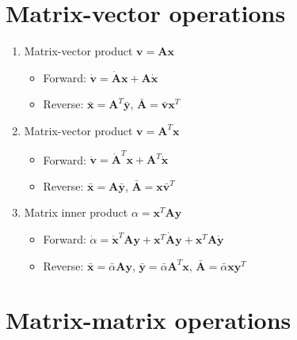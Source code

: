 \documentclass{article}
\begin{document}
\section{Matrix-vector operations}

\begin{enumerate}
\item Matrix-vector product $\mathbf{v} = \mathbf{A} \mathbf{x}$
\begin{itemize}
\item Forward: $\dot{\mathbf{v}} = \dot{\mathbf{A}} \mathbf{x} + \mathbf{A} \dot{\mathbf{x}}$
\item Reverse: $\bar{\mathbf{x}} = \mathbf{A}^{T} \bar{\mathbf{y}}$, $\bar{\mathbf{A}} = \bar{\mathbf{v}} \mathbf{x}^{T}$
\end{itemize}

\item Matrix-vector product $\mathbf{v} = \mathbf{A}^{T} \mathbf{x}$
\begin{itemize}
\item Forward: $\dot{\mathbf{v}} = \dot{\mathbf{A}}^{T} \mathbf{x} + \mathbf{A}^{T} \dot{\mathbf{x}}$
\item Reverse: $\bar{\mathbf{x}} = \mathbf{A} \bar{\mathbf{y}}$, $\bar{\mathbf{A}} = \mathbf{x} \bar{\mathbf{v}}^{T}$
\end{itemize}

\item Matrix inner product $\alpha = \mathbf{x}^{T} \mathbf{A} \mathbf{y}$
\begin{itemize}
\item Forward: $\dot{\alpha} = \dot{\mathbf{x}}^{T} \mathbf{A} \mathbf{y} + \mathbf{x}^{T} \dot{\mathbf{A}} \mathbf{y} + \mathbf{x}^{T} \mathbf{A} \dot{\mathbf{y}}$
\item Reverse: $\bar{\mathbf{x}} = \bar{\alpha} \mathbf{A} \mathbf{y}$, $\bar{\mathbf{y}} = \bar{\alpha} \mathbf{A}^{T} \mathbf{x}$, $\bar{\mathbf{A}} = \bar{\alpha} \mathbf{x} \mathbf{y}^{T}$
\end{itemize}


\end{enumerate}

\section{Matrix-matrix operations}
\end{document}
